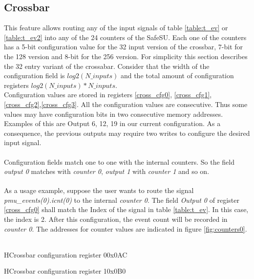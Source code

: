 \subsection{Crossbar}
This feature allows routing any of the input signals of table \ref{table:t_ev} or \ref{table:t_ev2} into any of the 24 counters of the SafeSU. Each one of the counters has a 5-bit configuration value for the 32 input version of the crossbar, 7-bit for the 128 version and 8-bit for the 256 version. For simplicity this section describes the 32 entry variant of the crossabar. Consider that the width of the configuration field is $log2(N\_inputs)$ and the total amount of configuration registers $log2(N\_inputs)*N\_inputs$.\\
Configuration values are stored in registers \ref{cross_cfg0}, \ref{cross_cfg1}, \ref{cross_cfg2},\ref{cross_cfg3}. All the configuration values are consecutive. Thus some values may have configuration bits in two consecutive memory addresses. Examples of this are Output 6, 12, 19 in our current configuration. As a consequence, the previous outputs may require two writes to configure the desired input signal.\\
\\
Configuration fields match one to one with the internal counters. So the field \textit{output 0} matches with \textit{counter 0}, \textit{output 1} with\textit{ counter 1} and so on.\\
\\
As a usage example, suppose the user wants to route the signal \textit{pmu\_events(0).icnt(0)} to the internal \textit{counter 0}. The field \textit{Output 0} of register \ref{cross_cfg0} shall match the  Index of the signal in table \ref{table:t_ev}. In this case, the index is 2. After this configuration, the event count will be recorded in \textit{counter 0}. The addresses for counter values are indicated in figure \ref{fig:counters0}.\\
\\
 \begin{register}{H}{Crossbar configuration register 0}{0x0AC}
	\label{cross_cfg0}
	\regnewline

\end{register}

 \begin{register}{H}{Crossbar configuration register 1}{0x0B0}
	\label{cross_cfg1}
	\regnewline
\end{register}

